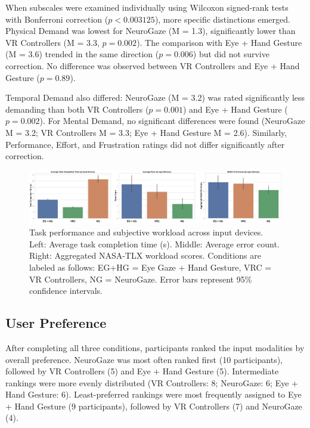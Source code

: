 \documentclass[utf8]{FrontiersinHarvard} %
\begin{document}
When subscales were examined individually using Wilcoxon signed-rank tests with Bonferroni correction ($p < 0.003125$), more specific distinctions emerged. Physical Demand was lowest for NeuroGaze (M = 1.3), significantly lower than VR Controllers (M = 3.3, $p = 0.002$). The comparison with Eye + Hand Gesture (M = 3.6) trended in the same direction ($p = 0.006$) but did not survive correction. No difference was observed between VR Controllers and Eye + Hand Gesture ($p = 0.89$).

Temporal Demand also differed: NeuroGaze (M = 3.2) was rated significantly less demanding than both VR Controllers ($p = 0.001$) and Eye + Hand Gesture ($p = 0.002$).
For Mental Demand, no significant differences were found (NeuroGaze M = 3.2; VR Controllers M = 3.3; Eye + Hand Gesture M = 2.6). Similarly, Performance, Effort, and Frustration ratings did not differ significantly after correction.

\begin{figure}[ht]
\begin{center}
\includegraphics[width=17cm]{figures/graphs.jpg}
\end{center}
\caption{Task performance and subjective workload across input devices. 
Left: Average task completion time (s). 
Middle: Average error count. 
Right: Aggregated NASA-TLX workload scores. 
Conditions are labeled as follows: EG+HG = Eye Gaze + Hand Gesture, VRC = VR Controllers, NG = NeuroGaze. 
Error bars represent 95\% confidence intervals.}
\label{fig:graphs}
\end{figure}

\subsection{User Preference}
After completing all three conditions, participants ranked the input modalities by overall preference. NeuroGaze was most often ranked first (10 participants), followed by VR Controllers (5) and Eye + Hand Gesture (5). Intermediate rankings were more evenly distributed (VR Controllers: 8; NeuroGaze: 6; Eye + Hand Gesture: 6). Least-preferred rankings were most frequently assigned to Eye + Hand Gesture (9 participants), followed by VR Controllers (7) and NeuroGaze (4). 
\end{document}
